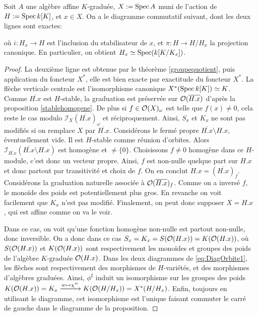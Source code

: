 \begin{prop}\label{staborbitegroup}
Soit $A$ une algèbre affine $K$-graduée, $X:=\operatorname{Spec} A$ muni de l'action de $H:=\operatorname{Spec} k[K]$, et $x\in X$. On a le diagramme commutatif suivant, dont les deux lignes sont exactes:
	\begin{center}
	\end{center}
	où $i:H_x\rightarrow H$ est l'inclusion du stabilisateur de $x$, et $\pi:H\rightarrow H/H_x$ la projection canonique. En particulier, on obtient $H_x\simeq \operatorname{Spec}(k[K/K_x])$.
\end{prop}
\begin{proof}
La deuxième ligne est obtenue par le théorème \ref{groupequotient}, puis application du foncteur $X^*$, elle est bien exacte par exactitude du foncteur $X^*$. La flèche verticale centrale est l'isomorphisme canonique $X^*(\operatorname{Spec} k[K])\simeq K$. Comme $\overline{H.x}$ est $H$-stable, la graduation est préservée sur $\mathcal{O}(\overline{H.x})$ d'après la proposition \ref{stablehomogene}. De plus si $f\in \mathcal{O}(X)_{\omega}$ est telle que $f(x)\neq 0$, cela reste le cas modulo $\mathcal{I}_{X}(\overline{H.x})_\omega$ et réciproquement. Ainsi, $S_x$ et $K_x$ ne sont pas modifiés si on remplace $X$ par $\overline{H.x}$. 
Considérons le fermé propre $\overline{H.x}\setminus H.x$, éventuellement vide. Il est $H$-stable comme réunion d'orbites. Alors $\mathcal{I}_{\overline{H.x}}(\overline{H.x}\setminus H.x)$ est homogène et $\neq \lbrace 0\rbrace$. Choisissons $f\neq0$ homogène dans ce $H$-module, c'est donc un vecteur propre. Ainsi, $f$ est non-nulle quelque part sur $H.x$ et donc partout par transitivité et choix de $f$. On en conclut $H.x=(\overline{H.x})_f$. Considérons la graduation naturelle associée à $\mathcal{O}(\overline{H.x})_f$. Comme on a inversé $f$, le monoïde des poids est potentiellement plus gros. En revanche on voit facilement que $K_x$ n'est pas modifié. Finalement, on peut donc supposer $X=H.x$, qui est affine comme on va le voir. 

Dans ce cas, on voit qu'une fonction homogène non-nulle est partout non-nulle, donc inversible. On a donc dans ce cas $S_x=K_x=S(\mathcal{O}(H.x))=K(\mathcal{O}(H.x))$, où $S(\mathcal{O}(H.x))$ et $K(\mathcal{O}(H.x))$ sont respectivement les monoïdes et groupes des poids de l'algèbre $K$-graduée $\mathcal{O}(H.x)$. Dans les deux diagrammes de \ref{eq:DiagOrbite1}, les flèches sont respectivement des morphismes de $H$-variétés, et des morphismes d'algèbres graduées. Ainsi, $\phi^\sharp$ induit un isomorphisme sur les groupes des poids $K(\mathcal{O}(H.x))=K_x \xrightarrow{w \mapsto\chi^w}K(\mathcal{O}(H/H_x))=X^*(H/H_x)$. Enfin, toujours en utilisant le diagramme, cet isomorphisme est l'unique faisant commuter le carré de gauche dans le diagramme de la proposition.
\end{proof}

